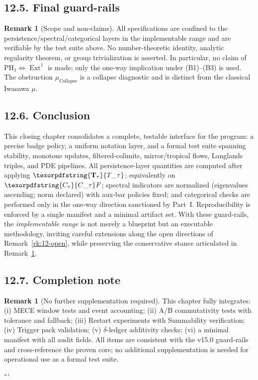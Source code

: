 \documentclass[11pt]{article}
\DeclareMathOperator{\Ext}{Ext}
\DeclareRobustCommand{\hyp}{\nobreakdash-}
\numberwithin{equation}{section}
\theoremstyle{definition}
\newtheorem{remark}[theorem]{Remark}
\DeclareRobustCommand{\Ttau}{\texorpdfstring{\ensuremath{\mathbf{T}_{\tau}}}{T\_\tau}}
\DeclareRobustCommand{\Ctau}{\texorpdfstring{\ensuremath{C_{\tau}}}{C\_\tau}}
\DeclareRobustCommand{\muc}{\mu_{\mathrm{Collapse}}}
\begin{document}
\subsection*{12.5. Final guard\hyp rails}
\begin{remark}[Scope and non\hyp claims]\label{rk:12-guards}
All specifications are confined to the persistence/spectral/categorical layers in the implementable range and are verifiable by the test suite above. No number\hyp theoretic identity, analytic regularity theorem, or group trivialization is asserted. In particular, no claim of \(\mathrm{PH}_1\Leftrightarrow \Ext^1\) is made; only the one\hyp way implication under (B1)–(B3) is used. The obstruction \(\muc\) is a collapse diagnostic and is distinct from the classical Iwasawa \(\mu\).
\end{remark}

\subsection*{12.6. Conclusion}
This closing chapter consolidates a complete, testable interface for the program: a precise badge policy, a uniform notation layer, and a formal test suite spanning stability, monotone updates, filtered\hyp colimits, mirror/tropical flows, Langlands triples, and PDE pipelines. All persistence\hyp layer quantities are computed after applying \(\Ttau\); equivalently on \(\Ctau F\); spectral indicators are normalized (eigenvalues ascending; norm declared) with aux\hyp bar policies fixed; and categorical checks are performed only in the one\hyp way direction sanctioned by Part~I. Reproducibility is enforced by a single manifest and a minimal artifact set. With these guard\hyp rails, the \emph{implementable range} is not merely a blueprint but an executable methodology, inviting careful extensions along the open directions of Remark~\ref{rk:12-open}, while preserving the conservative stance articulated in Remark~\ref{rk:12-guards}.

\subsection*{12.7. Completion note}
\begin{remark}[No further supplementation required]
This chapter fully integrates: (i) MECE window tests and event accounting; (ii) A/B commutativity tests with tolerance and fallback; (iii) Restart experiments with Summability verification; (iv) Trigger pack validation; (v) $\delta$-ledger additivity checks; (vi) a minimal manifest with all audit fields. All items are consistent with the v15.0 guard\hyp rails and cross\hyp reference the proven core; no additional supplementation is needed for operational use as a formal test suite.
\end{remark}
```
\end{document}

